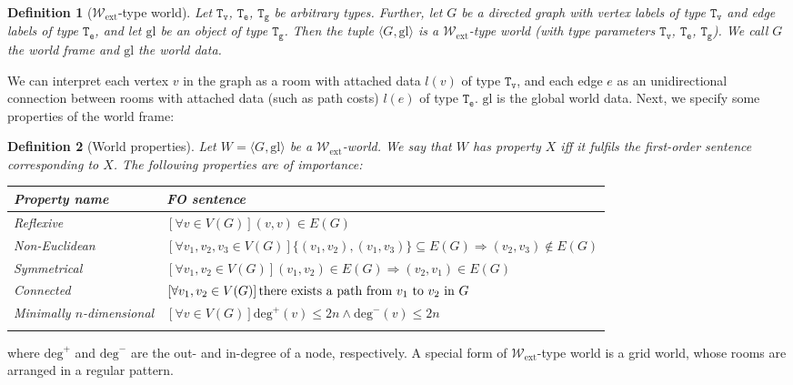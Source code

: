 \documentclass[]{scrartcl}
\theoremstyle{break}
\newtheorem{definition}{Definition}
\newcommand{\mt}[1]{\textnormal{#1}}
\newcommand{\allQ}[1]{\left[\forall #1 \right]}
\newcommand{\type}[1]{\mathtt{#1}}
\newcommand{\wext}{\ensuremath{\mathcal{W}_{\mathrm{ext}}}}
\newcommand{\tuple}[1]{\ensuremath{\langle #1 \rangle}}
\newcommand{\lp}{{\rm (}}
\newcommand{\rp}{{\rm )}}
\newcommand{\paren}[1]{\lp{#1}\rp}
\begin{document}
\begin{definition}[\wext-type world]\label{def:wext}
	Let $\type{T_v}$, $\type{T_e}$, $\type{T_g}$ be arbitrary types. Further, let $G$ be a directed graph with vertex labels of type $\type{T_v}$ and edge labels of type $\type{T_e}$, and let $\mathrm{gl}$ be an object of type $\type{T_g}$. Then the tuple \tuple{G, \mathrm{gl}} is a \wext-type world \paren{with type parameters $\type{T_v}$, $\type{T_e}$, $\type{T_g}$}. We call $G$ the {\em world frame} and $\mathrm{gl}$ the {\em world data}.
\end{definition}

We can interpret each vertex $v$ in the graph as a room with attached data $l(v)$ of type $\type{T_v}$, and each edge $e$ as an unidirectional connection between rooms with attached data (such as path costs) $l(e)$ of type $\type{T_e}$. $\mathrm{gl}$ is the global world data. Next, we specify some properties of the world frame:

\begin{definition}[World properties]
	Let $W = \tuple{G,\mathrm{gl}}$ be a \wext-world. We say that $W$ has property $X$ iff it fulfils the first-order sentence corresponding to $X$. The following properties are of importance:
	
	\begin{center}
		\begin{tabular}{l l}
		\toprule
		\textbf{Property name} & \textbf{FO sentence}\\
		\midrule\addlinespace[0.5em]
		Reflexive & $\allQ{v \in V(G)} (v,v) \in E(G)$\\ \addlinespace[0.7em]
		Non-Euclidean & $\allQ{v_1,v_2,v_3 \in V(G)} \{(v_1,v_2),(v_1,v_3)\} \subseteq E(G) \Rightarrow (v_2,v_3) \notin E(G)$\\ \addlinespace[0.7em]
		Symmetrical & $\allQ{v_1,v_2 \in V(G)} (v_1,v_2) \in E(G) \Rightarrow (v_2,v_1) \in E(G)$\\ \addlinespace[0.7em]
		Connected & $\allQ{v_1,v_2 \in V(G)} \mt{there exists a path from } v_1 \mt{ to } v_2 \mt{ in } G$\\ \addlinespace[0.7em]
		Minimally $n$-dimensional & $\allQ{v \in V(G)} \mathrm{deg}^+(v) \leq 2n \wedge \mathrm{deg}^-(v) \leq 2n$\\ \addlinespace[0.5em]
		\bottomrule
		\end{tabular}
	\end{center}
\end{definition}

where $\mathrm{deg}^+$ and $\mathrm{deg}^-$ are the out- and in-degree of a node, respectively.
A special form of \wext-type world is a grid world, whose rooms are arranged in a regular pattern.
\end{document}
